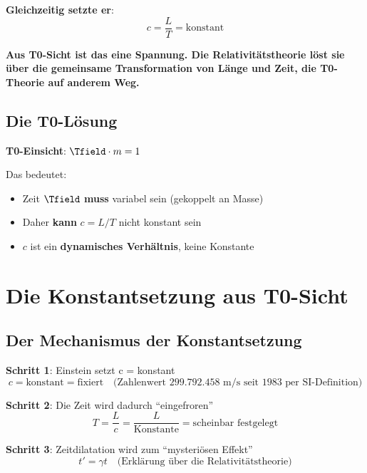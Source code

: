 	\textbf{Gleichzeitig setzte er}: 
	\begin{equation}
		c = \frac{L}{T} = \text{konstant}
	\end{equation}
	
	\textbf{Aus T0-Sicht ist das eine Spannung. Die Relativitätstheorie löst sie über die gemeinsame Transformation von Länge und Zeit, die T0-Theorie auf anderem Weg.}
	
	\subsection{Die T0-Lösung}
	
	\textbf{T0-Einsicht}: $\Tfield \cdot m = 1$
	
	Das bedeutet:
	\begin{itemize}
		\item Zeit $\Tfield$ \textbf{muss} variabel sein (gekoppelt an Masse)
		\item Daher \textbf{kann} $c = L/T$ nicht konstant sein
		\item $c$ ist ein \textbf{dynamisches Verhältnis}, keine Konstante
	\end{itemize}
	
	\section{Die Konstantsetzung aus T0-Sicht}
	
	\subsection{Der Mechanismus der Konstantsetzung}
	
	\textbf{Schritt 1}: Einstein setzt c = konstant
	\begin{equation}
		c = \text{konstant} = \text{fixiert} \quad \text{(Zahlenwert 299.792.458 m/s seit 1983 per SI-Definition)}
	\end{equation}
	
	\textbf{Schritt 2}: Die Zeit wird dadurch ``eingefroren''
	\begin{equation}
		T = \frac{L}{c} = \frac{L}{\text{Konstante}} = \text{scheinbar festgelegt}
	\end{equation}
	
	\textbf{Schritt 3}: Zeitdilatation wird zum ``mysteriösen Effekt''
	\begin{equation}
		t' = \gamma t \quad \text{(Erklärung über die Relativitätstheorie)}
	\end{equation}
	
